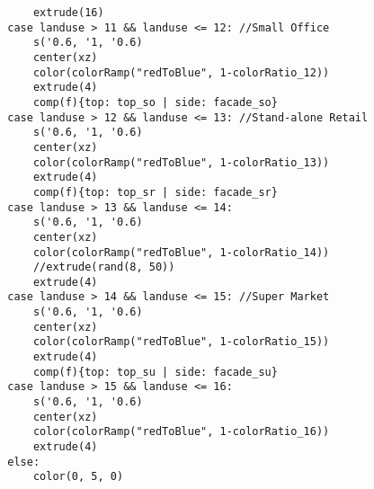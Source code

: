 \begin{multicols}{2}
\begin{verbatim}
            extrude(16) 
        case landuse > 11 && landuse <= 12: //Small Office
            s('0.6, '1, '0.6)
            center(xz)
            color(colorRamp("redToBlue", 1-colorRatio_12))
            extrude(4)
            comp(f){top: top_so | side: facade_so}
        case landuse > 12 && landuse <= 13: //Stand-alone Retail
            s('0.6, '1, '0.6)
            center(xz)
            color(colorRamp("redToBlue", 1-colorRatio_13))
            extrude(4)
            comp(f){top: top_sr | side: facade_sr}            
        case landuse > 13 && landuse <= 14: 
            s('0.6, '1, '0.6)
            center(xz)
            color(colorRamp("redToBlue", 1-colorRatio_14))
            //extrude(rand(8, 50))
            extrude(4)
        case landuse > 14 && landuse <= 15: //Super Market
            s('0.6, '1, '0.6)
            center(xz)
            color(colorRamp("redToBlue", 1-colorRatio_15))
            extrude(4)
            comp(f){top: top_su | side: facade_su} 
        case landuse > 15 && landuse <= 16: 
            s('0.6, '1, '0.6)
            center(xz)
            color(colorRamp("redToBlue", 1-colorRatio_16))
            extrude(4)
        else: 
            color(0, 5, 0) 
\end{verbatim}
\end{multicols}